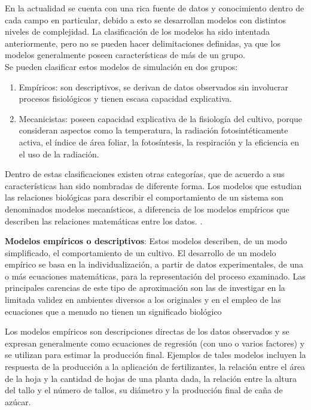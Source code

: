 En la actualidad se cuenta con una rica fuente de datos y conocimiento dentro de cada campo en particular, debido a esto se desarrollan modelos con distintos niveles de complejidad. La clasificación de los modelos ha sido intentada anteriormente, pero no se pueden hacer delimitaciones definidas, ya que los modelos generalmente poseen características de más de un grupo. \parencite{galvez2008modelacion, hernandez2009modelos}\\

Se pueden clasificar estos modelos de simulación en dos grupos:
\begin{enumerate}
	\item Empíricos: son descriptivos, se derivan de datos observados sin involucrar procesos fisiológicos y tienen escasa capacidad explicativa.
	\item Mecanicistas: poseen capacidad explicativa de la fisiología del cultivo, porque consideran aspectos como la temperatura, la radiación fotosintéticamente activa, el índice de área foliar, la fotosíntesis, la respiración y la eficiencia en el uso de la radiación. \parencite{refugio2004modelos}
\end{enumerate}

Dentro de estas clasificaciones existen otras categorías, que de acuerdo a sus características han sido nombradas de diferente forma.
Los modelos que estudian las relaciones biológicas para describir el comportamiento de un sistema son denominados modelos mecanísticos, a diferencia de los modelos empíricos que describen las relaciones matemáticas entre los datos. \parencite{vargas2004modelo}.

\textbf{Modelos empíricos o descriptivos}: Estos modelos describen, de un modo simplificado, el comportamiento de un cultivo.
El desarrollo de un modelo empírico se basa en la individualización, a partir de datos experimentales, de una o más ecuaciones matemáticas, para la representación del proceso examinado. Las principales carencias de este tipo de aproximación son las de investigar en la limitada validez en ambientes diversos a los originales y en el empleo de las ecuaciones que a menudo no tienen un significado biológico \parencite{bandi2003instrumentos}

Los modelos empíricos son descripciones directas de los datos observados y se expresan generalmente como ecuaciones de regresión (con uno o varios factores) y se utilizan para estimar la producción final. Ejemplos de tales modelos incluyen la respuesta de la producción a la aplicación de fertilizantes, la relación entre el área de la hoja y la cantidad de hojas de una planta dada, la relación entre la altura del tallo y el número de tallos, su diámetro y la producción final de caña de azúcar. \parencite{galvez2008modelacion}

